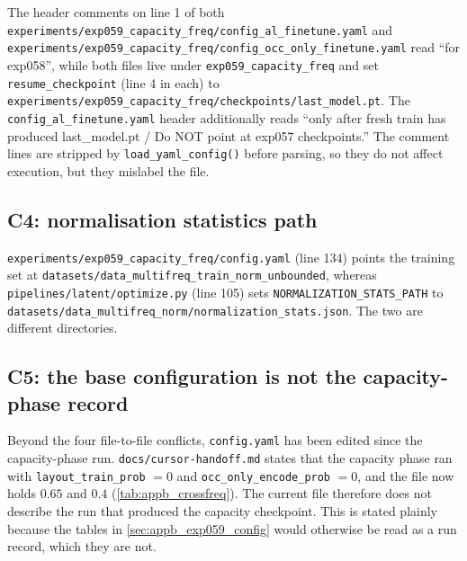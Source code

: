 The header comments on line 1 of both
\texttt{experiments/exp059\_capacity\_freq/config\_al\_finetune.yaml} and
\texttt{experiments/exp059\_capacity\_freq/config\_occ\_only\_finetune.yaml} read
``for exp058'', while both files live under \texttt{exp059\_capacity\_freq} and set
\texttt{resume\_checkpoint} (line 4 in each) to
\texttt{experiments/exp059\_capacity\_freq/checkpoints/last\_model.pt}. The
\texttt{config\_al\_finetune.yaml} header additionally reads ``only after fresh train has
produced last\_model.pt / Do NOT point at exp057 checkpoints.'' The comment lines are
stripped by \texttt{load\_yaml\_config()} before parsing, so they do not affect execution,
but they mislabel the file.

\subsection*{C4: normalisation statistics path}

\texttt{experiments/exp059\_capacity\_freq/config.yaml} (line 134) points the training set
at \texttt{datasets/data\_multifreq\_train\_norm\_unbounded}, whereas
\texttt{pipelines/latent/optimize.py} (line 105) sets
\texttt{NORMALIZATION\_STATS\_PATH} to
\texttt{datasets/data\_multifreq\_norm/normalization\_stats.json}. The two are different
directories.

\subsection*{C5: the base configuration is not the capacity-phase record}

Beyond the four file-to-file conflicts, \texttt{config.yaml} has been edited since the
capacity-phase run. \texttt{docs/cursor-handoff.md} states that the capacity phase ran
with \texttt{layout\_train\_prob} $=0$ and \texttt{occ\_only\_encode\_prob} $=0$, and the
file now holds $0.65$ and $0.4$ (\autoref{tab:appb_crossfreq}). The current file therefore
does not describe the run that produced the capacity checkpoint. This is stated plainly
because the tables in \autoref{sec:appb_exp059_config} would otherwise be read as a run
record, which they are not.

